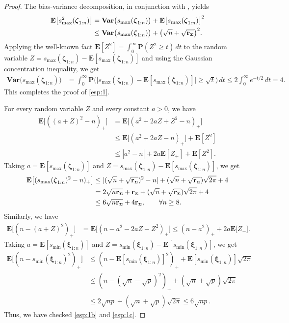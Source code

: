 \documentclass[aos,preprint,reqno]{imsart}
\newcommand\bxi{\boldsymbol\xi}
\newcommand\bzeta{\boldsymbol\zeta}
\newcommand\bSigma{\boldsymbol\Sigma}
\newcommand\bfE{\mathbf E}
\newcommand\bfP{\mathbf P}
\newcommand\rSigma{\textbf{\textup{r}}_{\scriptscriptstyle\bSigma}}
\theoremstyle{plain}
\theoremstyle{remark}
\begin{document}
	\begin{proof}
	The bias-variance decomposition, in conjunction with , yields
	\begin{align}
		\bfE\big[s_{\max}^2(\bzeta_{1:n})\big] &=  
		\textbf{Var}\big(s_{\max}(\bzeta_{1:n})\big)
			+\bfE\big[s_{\max}(\bzeta_{1:n})\big]^2\\
		&\le  \textbf{Var}\big(s_{\max}(\bzeta_{1:n})\big)+
			\big(\sqrt{n} + \sqrt{\rSigma}\big)^2.
	\end{align}
	Applying the well-known fact $\bfE[Z^2] = \int_0^\infty \bfP(Z^2\ge t)\,dt$ 
	to the random variable $Z= s_{\max}(\bzeta_{1:n}) - \bfE[s_{\max}(\bzeta_{1:n})]$ 
	and using the Gaussian concentration inequality, we get
	\begin{align}
		\textbf{Var}\big(s_{\max}(\bzeta_{1:n})\big) &= \int_0^\infty \mathbf{P}
		\Big(\big|s_{\max}(\bzeta_{1:n}) - \bfE[s_{\max}(\bzeta_{1:n})]
		\big|\ge \sqrt{t}\Big)\,dt \le 2\int_0^\infty e^{-t/2}\,dt = 4.
	\end{align}
	This completes the proof of \eqref{esp:1}. 

	For every random variable $Z$ and every constant $a>0$, we have
	\begin{align}
		\bfE\big[((a + Z)^2 - n)_+\big]
			&= \bfE\big[(a^2+2aZ +Z^2-n)_+\big] \\
			&\le \bfE\big[(a^2+2aZ-n)_+\big]  + \bfE[Z^2]\\
			&\le |a^2-n| + 2a\bfE[Z_+]  + \bfE[Z^2].
	\end{align}
	Taking $a = \bfE[s_{\max}(\bzeta_{1:n})]$ and $Z = s_{\max}(\bzeta_{1:n})
	-\bfE[s_{\max}(\bzeta_{1:n})]$, we get
	\begin{align}
	\bfE\big[(s_{\max}(\bzeta_{1:n})^2-n)_+\big]
			&\le |(\sqrt{n} + \sqrt{\rSigma})^2-n| + (\sqrt{n} + \sqrt{\rSigma})
			\sqrt{2\pi}  + 4\\
			&= 2\sqrt{n\rSigma} +\rSigma + (\sqrt{n} + \sqrt{\rSigma})
			\sqrt{2\pi}  + 4\\
			&\le 6\sqrt{n\rSigma} + 4\rSigma,\qquad \forall n\ge 8.
	\end{align}
	Similarly, we have
	\begin{align}
		\bfE\big[( n - (a + Z)^2 )_+\big]
			&= \bfE\big[(n- a^2 - 2aZ  - Z^2)_+\big] 
			\le (n- a^2)_+ +2a\bfE\big[ Z_-\big].
	\end{align}
	Taking $a = \bfE[s_{\min}(\bxi_{1:n})]$ and $Z = s_{\min}(\bxi_{1:n})
	-\bfE[s_{\min}(\bxi_{1:n})]$, we get
	\begin{align}
		\bfE\big[(n-s_{\min}(\bxi_{1:n})^2)_+\big] &\le 
		(n- \bfE[s_{\min}(\bxi_{1:n})]^2)_+ +\bfE[s_{\min}(\bxi_{1:n})]
		\sqrt{2\pi}\\
		&\le (n- (\sqrt{n} - \sqrt{p})^2)_++
		(\sqrt{n} + \sqrt{p})\sqrt{2\pi}\\
		&\le 2\sqrt{np} +(\sqrt{n} + \sqrt{p})\sqrt{2\pi}\le 
		6\sqrt{np}.
	\end{align}
	Thus, we have checked \eqref{esp:1b} and \eqref{esp:1c}. 
	

\end{proof}
\end{document}
